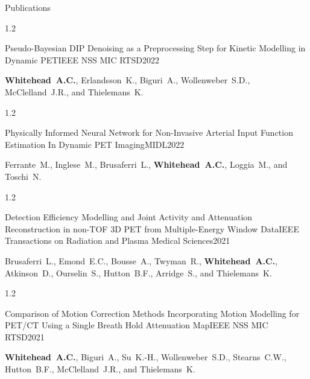 \documentclass{cv}
\begin{document}
\begin{rSection}{Publications}
        \vspace{-0.5cm}
        \begin{spacing}{1.2}
            \item \begin{rSubsection}{Pseudo-Bayesian DIP Denoising as a Preprocessing Step for Kinetic Modelling in Dynamic \newline PET}{}{IEEE NSS MIC RTSD}{2022}
                \vspace{-0.25cm}
                \item \textbf{Whitehead~A.C.}, Erlandsson~K., Biguri~A., Wollenweber~S.D., McClelland~J.R., and Thielemans~K.
            \end{rSubsection}
        \end{spacing}

        \vspace{-0.5cm}
        \begin{spacing}{1.2}
            \item \begin{rSubsection}{Physically Informed Neural Network for Non-Invasive Arterial Input Function Estimation In Dynamic PET Imaging}{}{MIDL}{2022}
                \vspace{-0.25cm}
                \item Ferrante~M., Inglese~M., Brusaferri~L., \textbf{Whitehead~A.C.}, Loggia~M., and Toschi~N.
            \end{rSubsection}
        \end{spacing}

        \vspace{-0.5cm}
        \begin{spacing}{1.2}
            \item \begin{rSubsection}{Detection Efficiency Modelling and Joint Activity and Attenuation Reconstruction in non-TOF 3D PET from Multiple-Energy Window Data}{}{IEEE Transactions on Radiation and Plasma Medical Sciences}{2021}
                \vspace{-0.25cm}
                \item Brusaferri~L., Emond~E.C., Bousse~A., Twyman~R., \textbf{Whitehead~A.C.}, Atkinson~D., Ourselin~S., Hutton~B.F., Arridge~S., and Thielemans~K.
            \end{rSubsection}
        \end{spacing}

        \vspace{-0.5cm}
        \begin{spacing}{1.2}
            \item \begin{rSubsection}{Comparison of Motion Correction Methods Incorporating Motion Modelling for PET/CT Using a Single Breath Hold Attenuation Map}{}{IEEE NSS MIC RTSD}{2021}
                \vspace{-0.25cm}
                \item \textbf{Whitehead~A.C.}, Biguri~A., Su~K.-H., Wollenweber~S.D., Stearns~C.W., Hutton~B.F., McClelland~J.R., and Thielemans~K.
            \end{rSubsection}
        \end{spacing}


\end{rSection}
\end{document}
